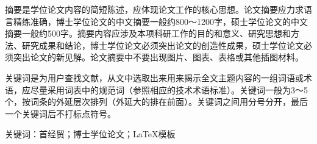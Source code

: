 \begin{abstractcn}
摘要是学位论文内容的简短陈述，应体现论文工作的核心思想。论文摘要应力求语言精练准确，博士学位论文的中文摘要一般约800～1200字，硕士学位论文的中文摘要一般约500字。摘要内容应涉及本项科研工作的目的和意义、研究思想和方法、研究成果和结论，博士学位论文必须突出论文的创造性成果，硕士学位论文必须突出论文的新见解。论文摘要中不要出现图片、图表、表格或其他插图材料。

关键词是为用户查找文献，从文中选取出来用来揭示全文主题内容的一组词语或术语，应尽量采用词表中的规范词（参照相应的技术术语标准）。关键词一般为3～5个，按词条的外延层次排列（外延大的排在前面）。关键词之间用分号分开，最后一个关键词后不打标点符号。

\heiti 关键词：\songti 首经贸；博士学位论文；LaTeX模板

\end{abstractcn} 